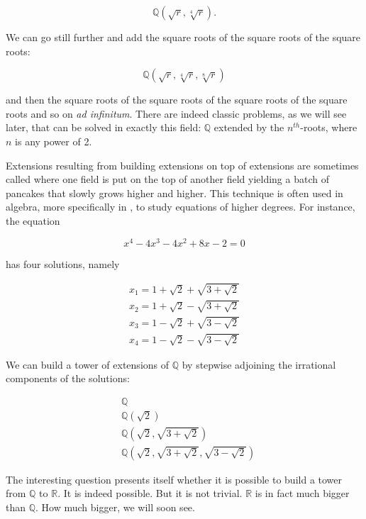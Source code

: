 \documentclass[tikz]{scrreprt}
\begin{document}
\[
\mathbb{Q}(\sqrt{r},\sqrt[4]{r}).
\]

We can go still further and add the square roots 
of the square roots of the square roots:

\[
\mathbb{Q}(\sqrt{r},\sqrt[4]{r},\sqrt[8]{r})
\]

and then the square roots of the square roots of the square roots
of the square roots and so on \emph{ad infinitum}.
There are indeed classic problems, as we will see later, that can be solved
in exactly this field: $\mathbb{Q}$ extended by the $n^{th}$-roots,
where $n$ is any power of 2.

Extensions resulting from building extensions on top of extensions 
are sometimes called  where one field is
put on the top of another field yielding a batch of pancakes 
that slowly grows higher and higher.
This technique is often used in algebra, more specifically in 
, to study equations of higher degrees.
For instance, the equation

\begin{equation}
x^4 - 4x^3 - 4x^2 + 8x - 2 = 0
\end{equation}

has four solutions, namely

\begin{align*}
x_1 = 1 + \sqrt{2} + \sqrt{3 + \sqrt{2}}\\
x_2 = 1 + \sqrt{2} - \sqrt{3 + \sqrt{2}}\\
x_3 = 1 - \sqrt{2} + \sqrt{3 - \sqrt{2}}\\
x_4 = 1 - \sqrt{2} - \sqrt{3 - \sqrt{2}}
\end{align*}

We can build a tower of extensions of $\mathbb{Q}$ by
stepwise adjoining the irrational components of the solutions:

\begin{align*}
&\mathbb{Q}\\
&\mathbb{Q}\left(\sqrt{2}\right)\\
&\mathbb{Q}\left(\sqrt{2},\sqrt{3+\sqrt{2}}\right)\\
&\mathbb{Q}\left(\sqrt{2},\sqrt{3+\sqrt{2}},\sqrt{3-\sqrt{2}}\right)
\end{align*}

The interesting question presents itself whether it is possible
to build a tower from $\mathbb{Q}$ to $\mathbb{R}$.
It is indeed possible. But it is not trivial.
$\mathbb{R}$ is in fact much bigger than $\mathbb{Q}$.
How much bigger, we will soon see.
\end{document}
